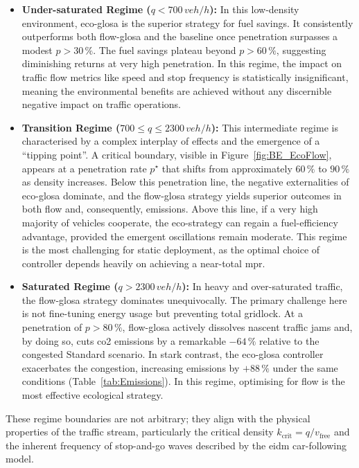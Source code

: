 \begin{itemize}
    \item \textbf{Under-saturated Regime ($q < 700\,\unit{veh/h}$):} In this low-density environment, \ac{eco-glosa} is the superior strategy for fuel savings. It consistently outperforms both \ac{flow-glosa} and the baseline once penetration surpasses a modest $p > 30\,\%$. The fuel savings plateau beyond $p > 60\,\%$, suggesting diminishing returns at very high penetration. In this regime, the impact on traffic flow metrics like speed and stop frequency is statistically insignificant, meaning the environmental benefits are achieved without any discernible negative impact on traffic operations.

    \item \textbf{Transition Regime ($700 \le q \le 2300\,\unit{veh/h}$):} This intermediate regime is characterised by a complex interplay of effects and the emergence of a \enquote{tipping point}. A critical boundary, visible in Figure~\ref{fig:BE_EcoFlow}, appears at a penetration rate $p^\star$ that shifts from approximately $60\,\%$ to $90\,\%$ as density increases. Below this penetration line, the negative externalities of \ac{eco-glosa} dominate, and the \ac{flow-glosa} strategy yields superior outcomes in both flow and, consequently, emissions. Above this line, if a very high majority of vehicles cooperate, the eco-strategy can regain a fuel-efficiency advantage, provided the emergent oscillations remain moderate. This regime is the most challenging for static deployment, as the optimal choice of controller depends heavily on achieving a near-total \ac{mpr}.

    \item \textbf{Saturated Regime ($q > 2300\,\unit{veh/h}$):} In heavy and over-saturated traffic, the \ac{flow-glosa} strategy dominates unequivocally. The primary challenge here is not fine-tuning energy usage but preventing total gridlock. At a penetration of $p > 80\,\%$, \ac{flow-glosa} actively dissolves nascent traffic jams and, by doing so, cuts \ac{co2} emissions by a remarkable $-64\,\%$ relative to the congested Standard scenario. In stark contrast, the \ac{eco-glosa} controller exacerbates the congestion, increasing emissions by $+88\,\%$ under the same conditions (Table~\ref{tab:Emissions}). In this regime, optimising for flow is the most effective ecological strategy.
\end{itemize}

These regime boundaries are not arbitrary; they align with the physical properties of the traffic stream, particularly the critical density $k_\mathrm{crit}=q/v_\mathrm{free}$ and the inherent frequency of stop-and-go waves described by the \ac{eidm} car-following model.

